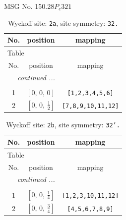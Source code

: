 \documentclass[fleqn,8pt]{jsarticle}
\begin{document}
\setcounter{MaxMatrixCols}{32}

\renewcommand{\tablename}{Table~}
\renewcommand{\figurename}{Figure~}
\begin{center}
\LARGE
MSG No. 150.28\quad$P_{c}321$
\end{center}
\renewcommand{\arraystretch}{1.2}
\begin{longtable}{ccc}
\caption{Wyckoff site: {\tt 2a}, site symmetry: {\tt 32.}}
 \\
 \hline \hline
No. & position & mapping \\ \hline \endfirsthead

\multicolumn{2}{l}{\tablename\ \thetable{}} \\
 \hline \hline
No. & position & mapping \\ \hline \endhead

 \hline \hline
\multicolumn{2}{r}{\footnotesize\it continued ...} \\ \endfoot

 \hline \hline
\multicolumn{2}{r}{} \\ \endlastfoot

1 & $\left[ 0,\, 0,\, 0 \right]$ & {\tt [1,2,3,4,5,6]} \\ \hline
2 & $\left[ 0,\, 0,\, \frac{1}{2} \right]$ & {\tt [7,8,9,10,11,12]} \\
\end{longtable}
\renewcommand{\arraystretch}{1.2}
\begin{longtable}{ccc}
\caption{Wyckoff site: {\tt 2b}, site symmetry: {\tt 32'.}}
 \\
 \hline \hline
No. & position & mapping \\ \hline \endfirsthead

\multicolumn{2}{l}{\tablename\ \thetable{}} \\
 \hline \hline
No. & position & mapping \\ \hline \endhead

 \hline \hline
\multicolumn{2}{r}{\footnotesize\it continued ...} \\ \endfoot

 \hline \hline
\multicolumn{2}{r}{} \\ \endlastfoot

1 & $\left[ 0,\, 0,\, \frac{1}{4} \right]$ & {\tt [1,2,3,10,11,12]} \\ \hline
2 & $\left[ 0,\, 0,\, \frac{3}{4} \right]$ & {\tt [4,5,6,7,8,9]} \\
\end{longtable}
\renewcommand{\arraystretch}{1.2}
\end{document}
